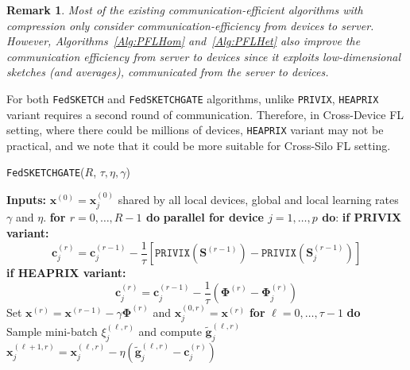 \documentclass[11pt]{article}
\newtheorem{remark}{Remark}
\newcommand\DrawBox[3][]{%
  \begin{tikzpicture}[remember picture,overlay]
    \draw[overlay,fill=gray!30,#1] 
    ([xshift=10em,yshift=-0.4ex]{pic cs:#2}) 
    rectangle 
    ([xshift=-4pt,yshift=1.1ex]pic cs:#3);
  \end{tikzpicture}%
}
\newcommand\DrawBoxx[3][]{%
  \begin{tikzpicture}[remember picture,overlay]
    \draw[overlay,fill=gray!30,#1] 
    ([xshift=-8.0em,yshift=-1.0ex]{pic cs:#2}) 
    rectangle 
    ([xshift=50pt,yshift=-1.2ex]pic cs:#3);
  \end{tikzpicture}%
}
\begin{document}
\begin{remark}\label{rmk:bidirect}
Most of the existing communication-efficient algorithms with compression only consider communication-efficiency from devices to server. However, Algorithms~\ref{Alg:PFLHom} and~\ref{Alg:PFLHet} also improve the communication efficiency from server to devices since it exploits low-dimensional sketches (and averages), communicated from the server to devices. 
\end{remark}
For both \texttt{FedSKETCH} and \texttt{FedSKETCHGATE} algorithms, unlike \texttt{PRIVIX}, \texttt{HEAPRIX} variant requires a second round of communication. 
Therefore, in Cross-Device FL setting, where there could be millions of devices, \texttt{HEAPRIX} variant may not be practical, and we note that it could be more suitable for Cross-Silo FL setting. 
\begin{algorithm}[t]
\caption{\texttt{FedSKETCHGATE}($R$, $\tau, \eta, \gamma$)}\label{Alg:PFLHet}
\begin{algorithmic}[1]
\STATE \textbf{Inputs:} $\boldsymbol{x}^{(0)}=\boldsymbol{x}^{(0)}_j$ shared by all local devices, global and local learning rates $\gamma$ and $\eta$.
\STATE \textbf{for $r=0, \ldots, R-1$ do}
\STATE   \textbf{parallel for device $j=1,\ldots,p$ do}:
\STATE  \hspace{0.02in} \textbf{if PRIVIX variant:} \label{line:cj_privix}
{\small$$\mathbf{c}_j^{(r)}=\mathbf{c}_j^{(r-1)}-\frac{1}{\tau}\left[{\texttt{PRIVIX}}\left(\mathbf{S}^{(r-1)}\right)-{\texttt{PRIVIX}}\left(\mathbf{S}^{(r-1)}_{j}\right)\right]$$}
\vspace{0.1cm}
\STATE  \hspace{0.02in} \textbf{if HEAPRIX variant:} 
{\small $$\mathbf{c}_j^{(r)}=\mathbf{c}_j^{(r-1)}-\frac{1}{\tau}\left(\mathbf{\Phi}^{(r)}-\mathbf{\Phi}^{(r)}_j\right)$$}
\STATE  Set $\boldsymbol{x}^{(r)}=\boldsymbol{x}^{(r-1)}-\gamma\mathbf{\Phi}^{(r)}$ and $\boldsymbol{x}_j^{(0,r)}=\boldsymbol{x}^{(r)}$ 
\STATE \hspace{0.02in} \textbf{for} $\ell=0,\ldots,\tau-1$ \textbf{do}
\STATE  $\quad  $Sample mini-batch $\xi_j^{(\ell,r)}$ and compute $\tilde{\mathbf{g}}_{j}^{(\ell,r)}$
\STATE $\quad  $$\boldsymbol{x}^{(\ell+1,r)}_{j}=\boldsymbol{x}^{(\ell,r)}_j-\eta \left( \tilde{\mathbf{g}}_{j}^{(\ell,r)}-\mathbf{c}_j^{(r)}\right)$ \label{eq:update-rule-alg-heter1}
$$
\end{algorithmic}
\end{algorithm}
\end{document}
